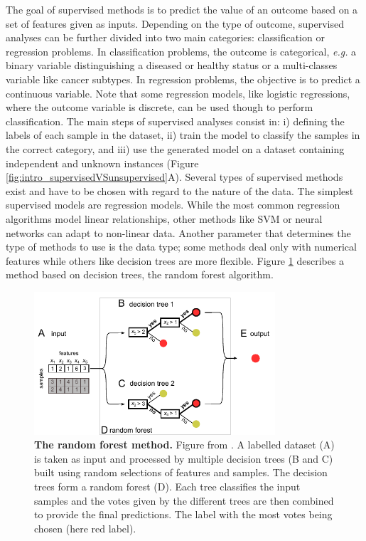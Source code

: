 The goal of supervised methods is to predict the value of an outcome based on a set of features given as inputs. Depending on the type of outcome, supervised analyses can be further divided into two main categories: classification or regression problems. In classification problems, the outcome is categorical, \textit{e.g.} a binary variable distinguishing a diseased or healthy status or a multi-classes variable like cancer subtypes. In regression problems, the objective is to predict a continuous variable. Note that some regression models, like logistic regressions, where the outcome variable is discrete, can be used though to perform classification.  
The main steps of supervised analyses consist in: i) defining the labels of each sample in the dataset, ii) train the model to classify the samples in the correct category, and iii) use the generated model on a dataset containing independent and unknown instances (Figure \ref{fig:intro_supervisedVSunsupervised}A). %
Several types of supervised methods exist and have to be chosen with regard to the nature of the data. The simplest supervised models are regression models. While the most common regression algorithms model linear relationships, other methods like \gls{SVM} or neural networks can adapt to non-linear data. Another parameter that determines the type of methods to use is the data type; some methods deal only with numerical features while others like decision trees are more flexible. Figure \ref{fig:intro_randomforest} describes a method based on decision trees, the random forest algorithm. 

\begin{figure}[H]
    \centering
    \includegraphics[width=0.8\textwidth]{Figures/Intro/random_forest.pdf}
    \caption[The random forest method]{\textbf{The random forest method.} Figure from \cite{Denisko2018}. A labelled dataset (A) is taken as input and processed by multiple decision trees (B and C) built using random selections of features and samples. The decision trees form a random forest (D). Each tree classifies the input samples and the votes given by the different trees are then combined to provide the final predictions. The label with the most votes being chosen (here red label). }
    \label{fig:intro_randomforest}
\end{figure}

